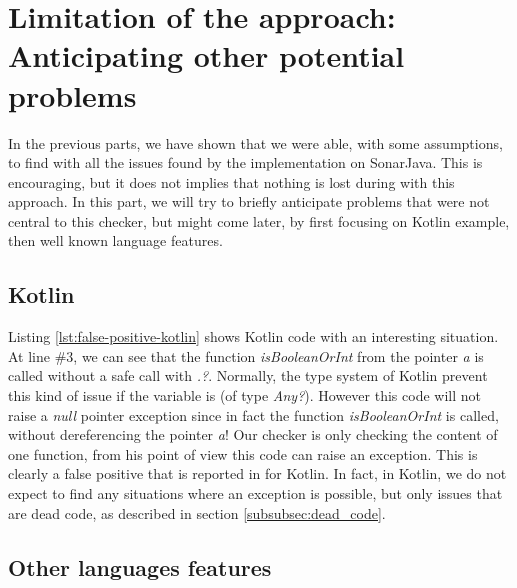\section{Limitation of the approach: Anticipating other potential problems}
\label{sec:anticipating_problems}

In the previous parts, we have shown that we were able, with some assumptions, to find with \slang{} all the issues found by the implementation on SonarJava. 
This is encouraging, but it does not implies that nothing is lost during with this approach.
In this part, we will try to briefly anticipate problems that were not central to this checker, but might come later, by first focusing on Kotlin example, then well known language features.

\subsection{Kotlin}
\label{subsec:kotlin}



Listing \ref{lst:false-positive-kotlin} shows Kotlin code with an interesting situation. 
At line $\#3$, we can see that the function \emph{isBooleanOrInt} from the pointer \emph{a} is called without a safe call with \emph{.?}. 
Normally, the type system of Kotlin prevent this kind of issue if the variable is \nullable{} (of type \emph{Any?}). 
However this code will not raise a \emph{null} pointer exception since in fact the function \emph{isBooleanOrInt} is called, without dereferencing the pointer \emph{a}! 
Our checker is only checking the content of one function, from his point of view this code can raise an exception. 
This is clearly a false positive that is reported in for Kotlin. 
In fact, in Kotlin, we do not expect to find any situations where an exception is possible, but only issues that are dead code, as described in section \ref{subsubsec:dead_code}.

\subsection{Other languages features}
\label{subsec:other_language_features}

